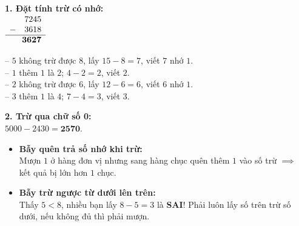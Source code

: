 \documentclass[11pt,a4paper]{article}
\begin{document}
\vspace{-2.5mm}
\noindent
\begin{minipage}[t]{0.49\textwidth}\vspace{0pt}
\begin{tcolorbox}[
  enhanced,
  colback=green!4!white,
  colframe=green!60!black,
  arc=2mm, boxrule=0.8pt,
  left=2mm, right=2mm, top=1.8mm, bottom=1.8mm,
  title={\footnotesize\bfseries\color{white}\faCheckCircle\ Ví dụ thực hành chuẩn mực}
]
{\footnotesize
\textbf{1. Đặt tính trừ có nhớ:}\\
$\begin{array}{r@{}l}
  7245 & \\
  -\quad 3618 & \\
  \hline
  \mathbf{3627} &
\end{array}$
\qquad
\begin{minipage}[c]{0.5\linewidth}
-- $5$ không trừ được $8$, lấy $15 - 8 = 7$, viết $7$ nhớ $1$.\\
-- $1$ thêm $1$ là $2$; $4 - 2 = 2$, viết $2$.\\
-- $2$ không trừ được $6$, lấy $12 - 6 = 6$, viết $6$ nhớ $1$.\\
-- $3$ thêm $1$ là $4$; $7 - 4 = 3$, viết $3$.
\end{minipage}

\textbf{2. Trừ qua chữ số 0:}\\
$5000 - 2430 = \mathbf{2570}$.
}
\end{tcolorbox}
\end{minipage}
\hfill
\begin{minipage}[t]{0.49\textwidth}\vspace{0pt}
\begin{tcolorbox}[
  enhanced,
  colback=red!4!white,
  colframe=red!70!black,
  arc=2mm, boxrule=0.8pt,
  left=2mm, right=2mm, top=1.8mm, bottom=1.8mm,
  title={\footnotesize\bfseries\color{white}\faExclamationTriangle\ Mẹo tránh bẫy trắc nghiệm}
]
{\footnotesize
\begin{itemize}\setlength{\itemsep}{1.5pt}\setlength{\leftskip}{-2.5mm}
  \item \textbf{Bẫy quên trả số nhớ khi trừ:}\\
  Mượn $1$ ở hàng đơn vị nhưng sang hàng chục quên thêm $1$ vào số trừ $\implies$ kết quả bị lớn hơn $1$ chục.
  \item \textbf{Bẫy trừ ngược từ dưới lên trên:}\\
  Thấy $5 < 8$, nhiều bạn lấy $8 - 5 = 3$ là \textbf{SAI}! Phải luôn lấy số trên trừ số dưới, nếu không đủ thì phải mượn.
\end{itemize}
}
\end{tcolorbox}
\end{minipage}
\end{document}
